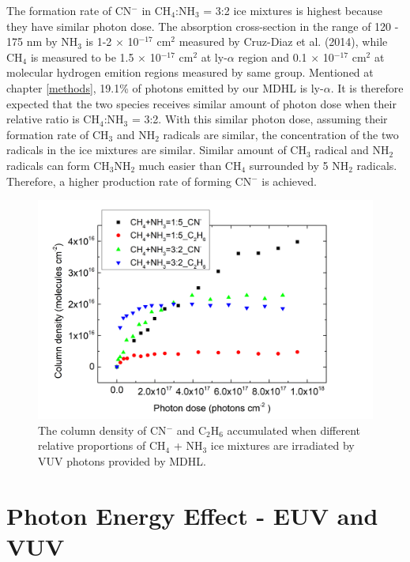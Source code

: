 The formation rate of CN$^-$ in CH$_4$:NH$_3$ = 3:2 ice mixtures is highest because they have similar photon dose. The absorption cross-section in the range of 120 - 175 nm by NH$_3$ is 1-2 $\times$ 10$^{-17}$ cm$^2$  measured by Cruz-Diaz et al. (2014)\cite{cruz2014vacuum}, while CH$_4$ is measured to be 1.5 $\times$ 10$^{-17}$ cm$^2$ at ly-$\alpha$ region and 0.1 $\times$ 10$^{-17}$ cm$^2$ at molecular hydrogen emition regions measured by same group\cite{cruz2014nonpolar}. Mentioned at chapter \ref{methods}, 19.1\% of photons emitted by our MDHL is ly-$\alpha$. It is therefore expected that the two species receives similar amount of photon dose when their relative ratio is CH$_4$:NH$_3$ = 3:2. With this similar photon dose, assuming their formation rate of CH$_3$ and NH$_2$ radicals are similar, the concentration of the two radicals in the ice mixtures are similar. Similar amount of CH$_3$ radical and NH$_2$ radicals can form CH$_3$NH$_2$ much easier than CH$_4$ surrounded by 5 NH$_2$ radicals. Therefore, a higher production rate of forming CN$^-$ is achieved.


\begin{figure}
\centering
\includegraphics[width=\textwidth]{figures/chapter3/C2H6_CN_comparison.png}
\caption{The column density of CN$^-$ and C$_2$H$_6$ accumulated when different relative proportions of CH$_4$ + NH$_3$ ice mixtures are irradiated by VUV photons provided by MDHL.}
\label{fig:C2H6_CN_comparison}
\end{figure}


\section{Photon Energy Effect - EUV and VUV} %


